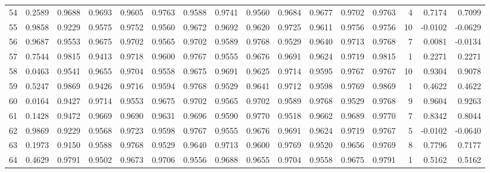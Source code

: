 \begin{tabular}{lrrrrrrrrrrrrrrr}
54  &      0.2589 &  0.9688 &  0.9693 &  0.9605 &  0.9763 &  0.9588 &  0.9741 &  0.9560 &  0.9684 &  0.9677 &   0.9702 &     0.9763 &      4 &                    0.7174 &                     0.7099 \\
55  &      0.9858 &  0.9229 &  0.9575 &  0.9752 &  0.9560 &  0.9672 &  0.9692 &  0.9620 &  0.9725 &  0.9611 &   0.9756 &     0.9756 &     10 &                   -0.0102 &                    -0.0629 \\
56  &      0.9687 &  0.9553 &  0.9675 &  0.9702 &  0.9565 &  0.9702 &  0.9589 &  0.9768 &  0.9529 &  0.9640 &   0.9713 &     0.9768 &      7 &                    0.0081 &                    -0.0134 \\
57  &      0.7544 &  0.9815 &  0.9413 &  0.9718 &  0.9600 &  0.9767 &  0.9555 &  0.9676 &  0.9691 &  0.9624 &   0.9719 &     0.9815 &      1 &                    0.2271 &                     0.2271 \\
58  &      0.0463 &  0.9541 &  0.9655 &  0.9704 &  0.9558 &  0.9675 &  0.9691 &  0.9625 &  0.9714 &  0.9595 &   0.9767 &     0.9767 &     10 &                    0.9304 &                     0.9078 \\
59  &      0.5247 &  0.9869 &  0.9426 &  0.9716 &  0.9594 &  0.9768 &  0.9529 &  0.9641 &  0.9712 &  0.9598 &   0.9769 &     0.9869 &      1 &                    0.4622 &                     0.4622 \\
60  &      0.0164 &  0.9427 &  0.9714 &  0.9553 &  0.9675 &  0.9702 &  0.9565 &  0.9702 &  0.9589 &  0.9768 &   0.9529 &     0.9768 &      9 &                    0.9604 &                     0.9263 \\
61  &      0.1428 &  0.9472 &  0.9669 &  0.9690 &  0.9631 &  0.9696 &  0.9590 &  0.9770 &  0.9518 &  0.9662 &   0.9689 &     0.9770 &      7 &                    0.8342 &                     0.8044 \\
62  &      0.9869 &  0.9229 &  0.9568 &  0.9723 &  0.9598 &  0.9767 &  0.9555 &  0.9676 &  0.9691 &  0.9624 &   0.9719 &     0.9767 &      5 &                   -0.0102 &                    -0.0640 \\
63  &      0.1973 &  0.9150 &  0.9588 &  0.9768 &  0.9529 &  0.9640 &  0.9713 &  0.9600 &  0.9769 &  0.9520 &   0.9656 &     0.9769 &      8 &                    0.7796 &                     0.7177 \\
64  &      0.4629 &  0.9791 &  0.9502 &  0.9673 &  0.9706 &  0.9556 &  0.9688 &  0.9655 &  0.9704 &  0.9558 &   0.9675 &     0.9791 &      1 &                    0.5162 &                     0.5162 \\

\end{tabular}
